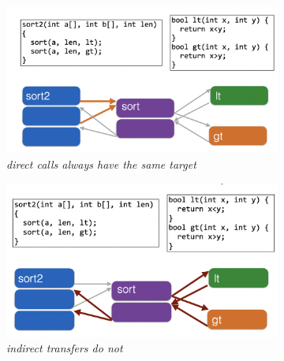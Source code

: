\documentclass[11pt, oneside]{article}   	%
\begin{document}
\begin{figure}[H]
\begin{subfigure}[H]{0.5\linewidth}
\includegraphics[width=\linewidth]{cfi2}
\emph{direct calls always have the same target}
\end{subfigure}
\begin{subfigure}[H]{0.5\linewidth}
\includegraphics[width=\linewidth]{cfi3}
\emph{indirect transfers do not}
\end{subfigure}%
\end{figure}
\end{document}

